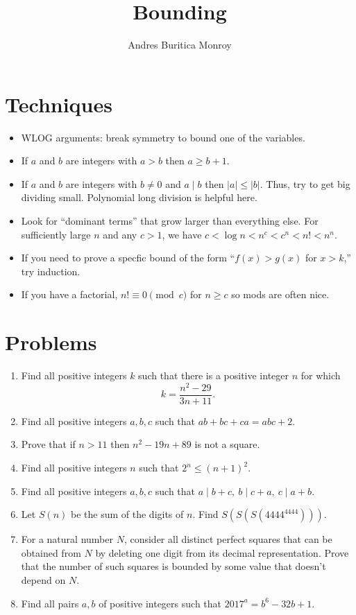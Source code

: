 \documentclass{article}
\title{Bounding}
\author{Andres Buritica Monroy}
\date{}
\begin{document}
\maketitle
\section{Techniques}
\begin{itemize}
	\item WLOG arguments: break symmetry to bound one of the variables.
	\item If $a$ and $b$ are integers with $a>b$ then $a\ge b+1$.
	\item If $a$ and $b$ are integers with $b\ne 0$ and $a\mid b$ then
	      $|a|\le|b|$. Thus, try to get big dividing small. Polynomial long division
	      is helpful here.
	\item Look for ``dominant terms'' that grow larger than everything else. For
	      sufficiently large $n$ and any $c>1$, we have $c<\log n<n^c<c^n<n!<n^n$.
	\item If you need to prove a specfic bound of the form ``$f(x)>g(x)$ for
	      $x>k$,'' try induction.
	\item If you have a factorial, $n!\equiv 0\pmod c$ for $n\ge c$ so mods are
	      often nice.
\end{itemize}
\section{Problems}
\begin{enumerate}
	\item Find all positive integers $k$ such that there is a positive integer $n$
	      for which
	      \[k=\frac{n^2-29}{3n+11}.\]
	\item Find all positive integers $a,b,c$ such that $ab+bc+ca=abc+2$.
	\item Prove that if $n>11$ then $n^2-19n+89$ is not a square.
	\item Find all positive integers $n$ such that $2^n\le (n+1)^2$.
	\item Find all positive integers $a,b,c$ such that $a\mid b+c,\ b\mid c+a,\
		      c\mid a+b$.
	\item Let $S(n)$ be the sum of the digits of $n$. Find $S(S(S(4444^{4444})))$.
	\item  For a natural number $N$, consider all distinct perfect squares that
	      can be obtained from $N$ by deleting one digit from its decimal
	      representation. Prove that the number of such squares is bounded by some
	      value that doesn't depend on $N$.
	\item Find all pairs $a,b$ of positive integers such that $2017^a=b^6-32b+1$.
\end{enumerate}
\newpage
\end{document}
